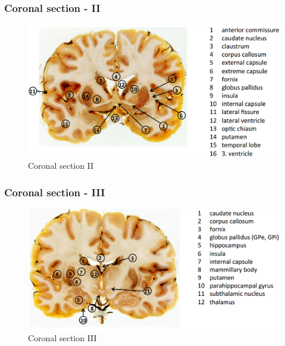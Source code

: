 \documentclass[12pt,article,oneside,a4paper]{memoir}
\begin{document}
\subsubsection{Coronal section - II}
\begin{figure}[H]
	\centering
  	\includegraphics[width=\linewidth]{imgs/coronal-section-II-answer.png}
	\caption{Coronal section II}
  	\label{fig:coronalSectionI}
\end{figure}

\subsubsection{Coronal section - III}
\begin{figure}[H]
	\centering
  	\includegraphics[width=\linewidth]{imgs/coronal-section-III-answer.png}
	\caption{Coronal section III}
  	\label{fig:coronalSectionI}
\end{figure}
\end{document}

